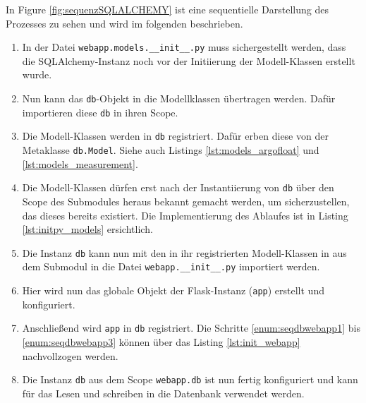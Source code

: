 In Figure \ref{fig:sequenzSQLALCHEMY} ist eine sequentielle Darstellung des Prozesses zu sehen und wird im folgenden beschrieben. 

\begin{enumerate}
 \item 
        In der Datei \texttt{webapp.models.\_\_init\_\_.py} muss sichergestellt werden, dass die SQLAlchemy-Instanz noch vor der Initiierung der Modell-Klassen erstellt wurde.
 \item 
        Nun kann das \texttt{db}-Objekt in die Modellklassen übertragen werden. Dafür importieren diese \texttt{db} in ihren Scope.
 \item 
        Die Modell-Klassen werden in \texttt{db} registriert. Dafür erben diese von der Metaklasse \texttt{db.Model}. Siehe auch Listings \ref{lst:models_argofloat} und \ref{lst:models_measurement}.
        

    
 \item 
        Die Modell-Klassen dürfen erst nach der Instantiierung von \texttt{db} über den Scope des Submodules heraus bekannt gemacht werden, um sicherzustellen, das dieses bereits existiert. Die Implementierung des Ablaufes ist in Listing \ref{lst:initpy_models} ersichtlich.
 \item  \label{enum:seqdbwebapp1}
        Die Instanz \texttt{db} kann nun mit den in ihr registrierten Modell-Klassen in aus dem Submodul in die Datei \texttt{webapp.\_\_init\_\_.py} importiert werden.

\item   
        Hier wird nun das globale Objekt der Flask-Instanz (\texttt{app}) erstellt und konfiguriert. 
        
        
\item   \label {enum:seqdbwebapp3}
        Anschließend wird \texttt{app} in \texttt{db} registriert. Die Schritte \ref{enum:seqdbwebapp1} bis \ref{enum:seqdbwebapp3} können über das Listing \ref{lst:init_webapp} nachvollzogen werden.
        
\item   Die Instanz \texttt{db} aus dem Scope        
        \texttt{webapp.db} ist nun fertig konfiguriert und kann für das Lesen und schreiben in die Datenbank verwendet werden.
\end{enumerate}











